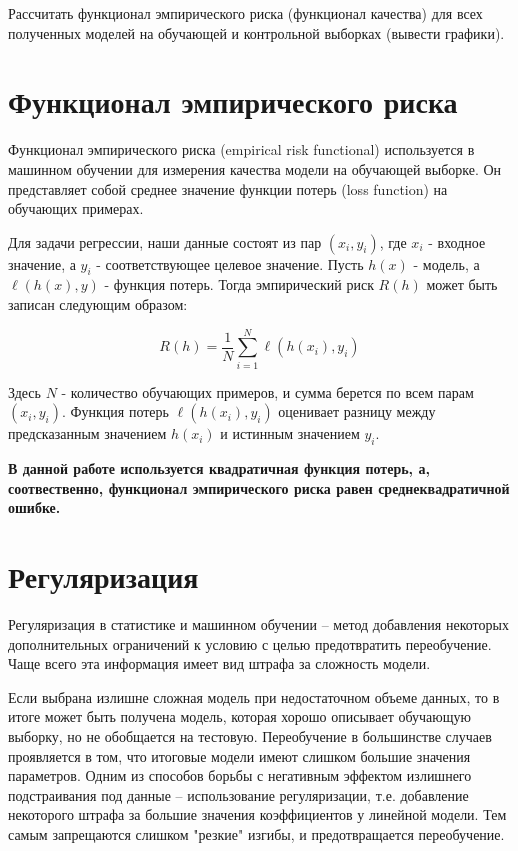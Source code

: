 \documentclass[12pt]{report}
\begin{document}
Рассчитать функционал эмпирического риска (функционал качества) для всех полученных моделей на обучающей и контрольной выборках (вывести графики).


\section{Функционал эмпирического риска}

Функционал эмпирического риска (empirical risk functional) используется в машинном обучении для измерения качества модели на обучающей выборке. Он представляет собой среднее значение функции потерь (loss function) на обучающих примерах.

Для задачи регрессии, наши данные состоят из пар $(x_i, y_i)$, где $x_i$ - входное значение, а $y_i$ - соответствующее целевое значение. Пусть $h(x)$ - модель, а $\ell(h(x), y)$ - функция потерь. Тогда эмпирический риск $R(h)$ может быть записан следующим образом:

\begin{equation*}
R(h) = \frac{1}{N} \sum_{i=1}^{N} \ell(h(x_i), y_i)
\end{equation*}

Здесь $N$ - количество обучающих примеров, и сумма берется по всем парам $(x_i, y_i)$. Функция потерь $\ell(h(x_i), y_i)$ оценивает разницу между предсказанным значением $h(x_i)$ и истинным значением $y_i$. 

\textbf{В данной работе используется квадратичная функция потерь, а, соотвественно, функционал эмпирического риска равен среднеквадратичной ошибке.} 

\section{Регуляризация}
Регуляризация  в статистике и машинном обучении -- метод добавления некоторых дополнительных ограничений к условию с целью предотвратить переобучение. Чаще всего эта информация имеет вид штрафа за сложность модели.

Если выбрана излишне сложная модель при недостаточном объеме данных, то в итоге может быть получена модель, которая хорошо описывает обучающую выборку, но не обобщается на тестовую. Переобучение в большинстве случаев проявляется в том, что итоговые модели имеют слишком большие значения параметров. Одним из способов борьбы с негативным эффектом излишнего подстраивания под данные -- использование регуляризации, т.е. добавление некоторого штрафа за большие значения коэффициентов у линейной модели. Тем самым запрещаются слишком "резкие" изгибы, и предотвращается переобучение.
\end{document}

